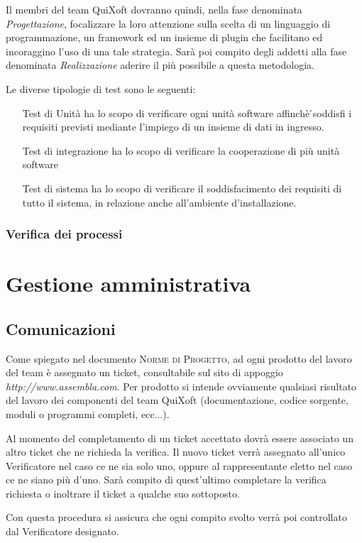 \documentclass[11pt,a4paper]{article}
\begin{document}
Il membri del team QuiXoft dovranno quindi, nella fase denominata \textit{Progettazione}, focalizzare la loro attenzione sulla scelta di un linguaggio di programmazione, un framework ed un insieme di plugin che facilitano ed incoraggino l'uso di una tale strategia. Sarà poi compito degli addetti alla fase denominata \textit{Realizzazione} aderire il più possibile a questa metodologia.

Le diverse tipologie di test sono le seguenti:
\begin{itemize}
 \item[Test di Unità] ha lo scopo di verificare ogni unità software affinchè ́soddisfi i requisiti previsti mediante l’impiego di un insieme di dati in ingresso.
 \item[Test di integrazione] ha lo scopo di verificare la cooperazione di più unità software
 \item[Test di sistema] ha lo scopo di verificare il soddisfacimento dei requisiti di tutto il sistema, in relazione anche all'ambiente d'installazione.

\end{itemize}
\subsubsection{Verifica dei processi}
\section{Gestione amministrativa}
\subsection{Comunicazioni}
Come spiegato nel documento \textsc{Norme di Progetto}, ad ogni prodotto del lavoro del team è assegnato un ticket, consultabile sul sito di appoggio \textit{http://www.assembla.com}. Per prodotto si intende ovviamente qualsiasi risultato del lavoro dei componenti del team QuiXoft (documentazione, codice sorgente, moduli o programmi completi, ecc...).

Al momento del completamento di un ticket accettato dovrà essere associato un altro ticket che ne richieda la verifica. Il nuovo ticket verrà assegnato all'unico Verificatore nel caso ce ne sia solo uno, oppure al rappresentante eletto nel caso ce ne siano più d'uno. Sarà compito di quest'ultimo completare la verifica richiesta o inoltrare il ticket a qualche suo sottoposto.

Con questa procedura si assicura che ogni compito svolto verrà poi controllato dal Verificatore designato.
\end{document}
